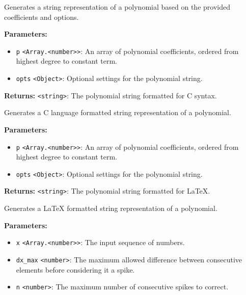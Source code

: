 \documentclass[12pt,a4paper]{article}
\begin{document}
\noindent Generates a string representation of a polynomial based on the provided coefficients and options.

\vspace{5mm}
\noindent {}


\noindent \textbf{Parameters:}
\begin{itemize}
  \item \texttt{p} \texttt{<Array.<number>>}: An array of polynomial coefficients, ordered from highest degree to constant term.
  \item \texttt{opts} \texttt{<Object>}: Optional settings for the polynomial string.
\end{itemize}

\noindent \textbf{Returns:} \texttt{<string>}: The polynomial string formatted for C syntax.

\noindent Generates a C language formatted string representation of a polynomial.

\vspace{5mm}
\noindent {}


\noindent \textbf{Parameters:}
\begin{itemize}
  \item \texttt{p} \texttt{<Array.<number>>}: An array of polynomial coefficients, ordered from highest degree to constant term.
  \item \texttt{opts} \texttt{<Object>}: Optional settings for the polynomial string.
\end{itemize}

\noindent \textbf{Returns:} \texttt{<string>}: The polynomial string formatted for LaTeX.

\noindent Generates a LaTeX formatted string representation of a polynomial.

\vspace{5mm}
\noindent {}


\noindent \textbf{Parameters:}
\begin{itemize}
  \item \texttt{x} \texttt{<Array.<number>>}: The input sequence of numbers.
  \item \texttt{dx\_max} \texttt{<number>}: The maximum allowed difference between consecutive elements before considering it a spike.
  \item \texttt{n} \texttt{<number>}: The maximum number of consecutive spikes to correct.
\end{itemize}
\end{document}
